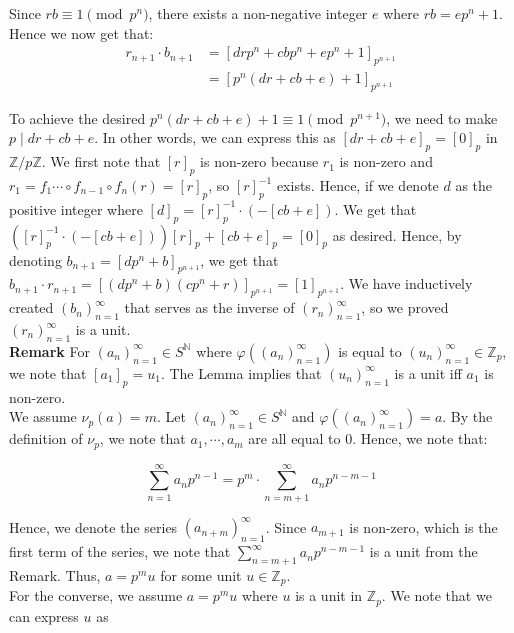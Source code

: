 \documentclass{article}
\begin{document}
\begin{enumerate}
\begin{enumerate}
    Since $rb \equiv 1 \pmod {p^n}$, there exists a non-negative integer $e$ where $rb = ep^n + 1$. Hence we now get that: 
    \begin{align*}
        r_{n+1} \cdot b_{n+1} &= [drp^n + cbp^n + ep^n + 1]_{p^{n+1}} \\
        &= [p^n(dr + cb + e) + 1]_{p^{n+1}}
    \end{align*}

    To achieve the desired $p^n(dr + cb + e) + 1 \equiv 1 \pmod {p^{n+1}}$, we need to make $p \mid dr + cb + e$. In other words, we can express this as $[dr + cb + e]_p = [0]_p$ in $\mathbb{Z}/p\mathbb{Z}$. We first note that $[r]_p$ is non-zero because $r_1$ is non-zero and $r_1 = f_1 \cdots \circ f_{n-1} \circ f_n (r) = [r]_p$, so $[r]_p^{-1}$ exists. Hence, if we denote $d$ as the positive integer where $[d]_p = [r]_p^{-1} \cdot (-[cb + e])$. We get that $([r]_p^{-1} \cdot (-[cb + e]))[r]_p + [cb + e]_p = [0]_p$ as desired. Hence, by denoting $b_{n+1} = [dp^n + b]_{p^{n+1}}$, we get that $b_{n+1} \cdot r_{n+1} = [(dp^n + b)(cp^n + r)]_{p^{n+1}} = [1]_{p^{n+1}}$. We have inductively created $(b_n)^{\infty}_{n=1}$ that serves as the inverse of $(r_n)^{\infty}_{n=1}$, so we proved $(r_n)^{\infty}_{n=1}$ is a unit. \\

    \textbf{Remark} For $(a_n)^{\infty}_{n=1} \in S^{\mathbb{N}}$ where $\varphi((a_n)^{\infty}_{n=1})$ is equal to $(u_n)^{\infty}_{n=1} \in \mathbb{Z}_p$, we note that $[a_1]_p = u_1$. The Lemma implies that $(u_n)^{\infty}_{n=1}$ is a unit iff $a_1$ is non-zero. \\

    We assume $\nu_p(a) = m$. Let $(a_n)^{\infty}_{n=1} \in S^{\mathbb{N}}$ and $\varphi((a_n)^{\infty}_{n=1}) = a$. By the definition of $\nu_p$, we note that $a_1, \cdots, a_{m}$ are all equal to $0$. Hence, we note that:

    $$\sum^{\infty}_{n= 1} a_n p^{n-1} = p^m \cdot \sum^{\infty}_{n= m + 1} a_n p^{n-m-1}$$ 

    Hence, we denote the series $(a_{n+m})^{\infty}_{n=1}$. Since $a_{m+1}$ is non-zero, which is the first term of the series, we note that $\sum^{\infty}_{n= m + 1} a_n p^{n-m-1}$ is a unit from the Remark. Thus, $a = p^m u$ for some unit $u \in \mathbb{Z}_p$. \\ 

    For the converse, we assume $a = p^m u$ where $u$ is a unit in $\mathbb{Z}_p$. We note that we can express $u$ as


\end{enumerate}
\end{enumerate}
\end{document}
